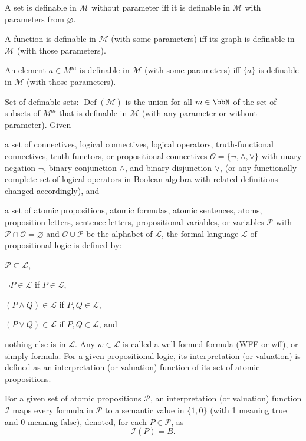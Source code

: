 \documentclass[a4paper,12pt]{article}
\begin{document}
\item A set is definable in $\mathcal{M}$ without parameter iff it is definable in $\mathcal{M}$ with parameters from $\varnothing$.
\item A function is definable in $\mathcal{M}$ (with some parameters) iff its graph is definable in $\mathcal{M}$ (with those parameters).
\item An element $a\in M^m$ is definable in $\mathcal{M}$ (with some parameters) iff $\{a\}$ is definable in $\mathcal{M}$ (with those parameters).
\item Set of definable sets: $\operatorname{Def}(\mathcal{M})$ is the union for all $m\in\bbN$ of the set of subsets of $M^m$ that is definable in $\mathcal{M}$ (with any parameter or without parameter).
\eit
{}
Given
\bit
\item a set of connectives, logical connectives, logical operators, truth-functional connectives, truth-functors, or propositional connectives $\mathcal{O}=\{\neg,\land,\lor\}$ with unary negation $\neg$, binary conjunction $\land$, and binary disjunction $\lor$, (or any functionally complete set of logical operators in Boolean algebra with related definitions changed accordingly), and
\item a set of atomic propositions, atomic formulas, atomic sentences, atoms, proposition letters, sentence letters, propositional variables, or variables $\mathcal{P}$ with $\mathcal{P}\cap\mathcal{O}=\varnothing$ and $\mathcal{O}\cup\mathcal{P}$ be the alphabet of $\mathcal{L}$,
\eit
the formal language $\mathcal{L}$ of propositional logic is defined by:
\bit
\item $\mathcal{P}\subseteq\mathcal{L}$,
\item $\neg P\in\mathcal{L}$ if $P\in\mathcal{L}$,
\item $(P\land Q)\in\mathcal{L}$ if $P,Q\in\mathcal{L}$,
\item $(P\lor Q)\in\mathcal{L}$ if $P,Q\in\mathcal{L}$, and
\item nothing else is in $\mathcal{L}$.
\eit
Any $w\in\mathcal{L}$ is called a well-formed formula (WFF or wff), or simply formula.
For a given propositional logic, its interpretation (or valuation) is defined as an interpretation (or valuation) function of its set of atomic propositions.

For a given set of atomic propositions $\mathcal{P}$, an interpretation (or valuation) function $\mathcal{I}$ maps every formula in $\mathcal{P}$ to a semantic value in $\{1,0\}$ (with 1 meaning true and 0 meaning false), denoted, for each $P\in\mathcal{P}$, as
\[\mathcal{I}(P)=B.\]
\end{document}
